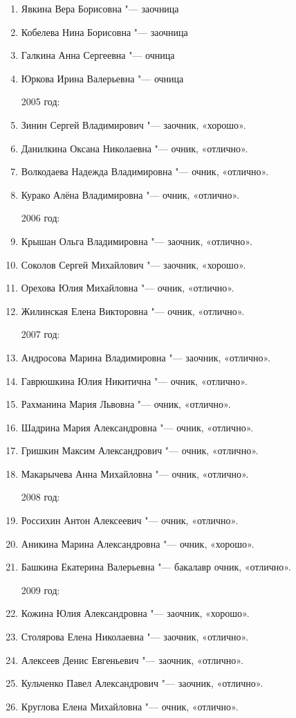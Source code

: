 \begin{enumerate}[nosep]
{2004 год:}
	\item Явкина Вера Борисовна "--- заочница
	\item Кобелева Нина Борисовна "--- заочница
	\item Галкина Анна Сергеевна "--- очница
	\item Юркова Ирина Валерьевна "--- очница

{2005 год:}
	\item Зинин Сергей Владимирович "--- заочник, «хорошо».
	\item Данилкина Оксана Николаевна "--- очник, «отлично».
	\item Волкодаева Надежда Владимировна "--- очник, «отлично».
	\item Курако Алёна Владимировна "--- очник, «отлично».
	
{2006 год:}
	\item Крышан Ольга Владимировна "--- заочник, «отлично».
	\item Соколов Сергей Михайлович "--- заочник, «хорошо».
	\item Орехова Юлия Михайловна "--- очник, «отлично».
	\item Жилинская Елена Викторовна "--- очник, «отлично».
	
{2007 год:}
	\item Андросова Марина Владимировна "--- заочник, «отлично».
	\item Гаврюшкина Юлия Никитична "--- очник, «отлично».
	\item Рахманина Мария Львовна "--- очник, «отлично».
	\item Шадрина Мария Александровна "--- очник, «отлично».
	\item Гришкин Максим Александрович "--- очник, «отлично». 
	\item Макарычева Анна Михайловна "--- очник, «отлично».
	
{2008 год:}
	\item Россихин Антон Алексеевич "--- очник, «отлично».
	\item Аникина Марина Александровна "--- очник, «хорошо».
	\item Башкина Екатерина Валерьевна "--- бакалавр очник, «отлично».
	
{2009 год:}
	\item Кожина Юлия Александровна "--- заочник, «хорошо».
	\item Столярова Елена Николаевна "--- заочник, «отлично».
	\item Алексеев Денис Евгеньевич "--- заочник, «отлично».
	\item Кульченко Павел Александрович "--- заочник, «отлично».
	\item Круглова Елена Михайловна "--- очник, «отлично».
	

\end{enumerate}

